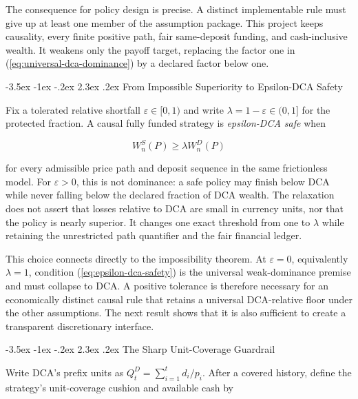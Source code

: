 \documentclass[12pt,a4paper,oneside]{report}
\makeatletter
\renewcommand\section{\@startsection{section}{1}{\z@}%
  {-3.5ex \@plus -1ex \@minus -.2ex}%
  {2.3ex \@plus .2ex}%
  {\normalfont\fontsize{14}{17}\selectfont\bfseries}}
\makeatother
\begin{document}
The consequence for policy design is precise. A distinct implementable rule
must give up at least one member of the assumption package. This project keeps
causality, every finite positive path, fair same-deposit funding, and
cash-inclusive wealth. It weakens only the payoff target, replacing the factor
one in (\ref{eq:universal-dca-dominance}) by a declared factor below one.

\section{From Impossible Superiority to Epsilon-DCA Safety}
\label{sec:safety-relaxation}

Fix a tolerated relative shortfall $\varepsilon\in[0,1)$ and write
$\lambda=1-\varepsilon\in(0,1]$ for the protected fraction. A causal fully
funded strategy is \emph{epsilon-DCA safe} when

\begin{equation}
  W_n^S(P)\geq\lambda W_n^D(P)
  \label{eq:epsilon-dca-safety}
\end{equation}

for every admissible price path and deposit sequence in the same frictionless
model. For $\varepsilon>0$, this is not dominance: a safe policy may finish below DCA
while never falling below the declared fraction of DCA wealth. The relaxation
does not assert that losses relative to DCA are small in currency units, nor
that the policy is nearly superior. It changes one exact threshold from one to
$\lambda$ while retaining the unrestricted path quantifier and the fair
financial ledger.

This choice connects directly to the impossibility theorem. At
$\varepsilon=0$, equivalently $\lambda=1$, condition
(\ref{eq:epsilon-dca-safety}) is the universal weak-dominance premise and must
collapse to DCA. A positive tolerance is therefore necessary for an
economically distinct causal rule that retains a universal DCA-relative floor
under the other assumptions. The next result shows that it is also sufficient
to create a transparent discretionary interface.

\section{The Sharp Unit-Coverage Guardrail}
\label{sec:unit-guardrail}

Write DCA's prefix units as
$Q_t^D=\sum_{i=1}^{t}d_i/p_i$. After a covered history, define the strategy's
unit-coverage cushion and available cash by
\end{document}
